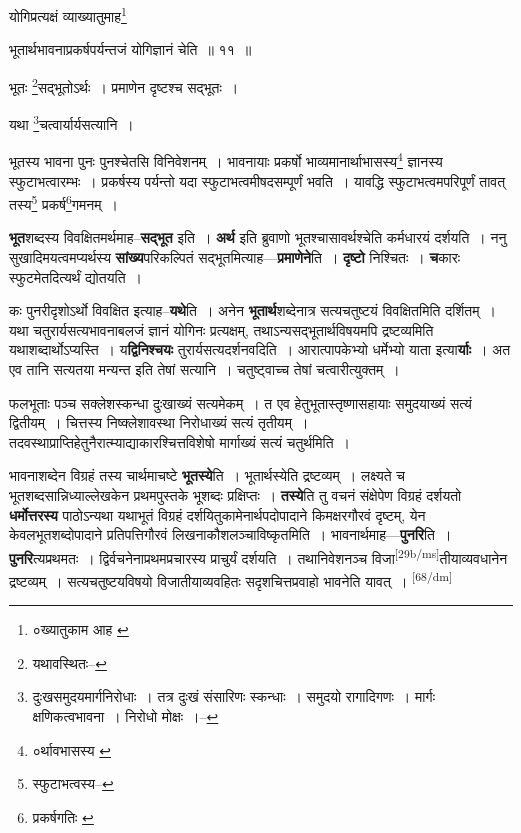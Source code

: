 \documentclass[article,12pt,a4paper]{memoir}
\begin{document}
	  \pstart योगिप्रत्यक्षं व्याख्यातुमाह\footnote{०ख्यातुकाम आह \cite{dp-msC} \cite{dp-msD}}
	\pend
      

	  \pstart भूतार्थभावनाप्रकर्षपर्यन्तजं योगिज्ञानं चेति ॥ ११ ॥
	\pend
      

	  \pstart भूतः \footnote{यथावस्थितः--\cite{dp-msD-n}}सद्भूतोऽर्थः । प्रमाणेन दृष्टश्च सद्भूतः ।
	\pend
      

	  \pstart यथा \footnote{दुःखसमुदयमार्गनिरोधाः । तत्र दुःखं संसारिणः स्कन्धाः । समुदयो रागादिगणः । मार्गः क्षणिकत्वभावना । निरोधो मोक्षः ।--\cite{dp-msD-n}}चत्वार्यार्यसत्यानि ।
	\pend
      

	  \pstart भूतस्य भावना पुनः पुनश्चेतसि विनिवेशनम् । भावनायाः प्रकर्षो भाव्यमानार्थाभासस्य\footnote{०र्थावभासस्य \cite{dp-msB} \cite{dp-edN}} ज्ञानस्य स्फुटाभत्वारम्भः । प्रकर्षस्य पर्यन्तो यदा स्फुटाभत्वमीषदसम्पूर्णं भवति । यावद्धि स्फुटाभत्वमपरिपूर्णं तावत् तस्य\footnote{स्फुटाभत्वस्य--\cite{dp-msD-n}} प्रकर्ष\footnote{प्रकर्षगतिः \cite{dp-msA} \cite{dp-edP} \cite{dp-edH} \cite{dp-edE} \cite{dp-edN}}गमनम् ।
	\pend
      

	  \pstart \textbf{भूत}शब्दस्य विवक्षितमर्थमाह--\textbf{सद्भूत} इति । \textbf{अर्थ} इति ब्रुवाणो भूतश्चासावर्थश्चेति कर्मधारयं दर्शयति । ननु सुखादिमयत्वमप्यर्थस्य \textbf{सांख्य}परिकल्पितं सद्भूतमित्याह—\textbf{प्रमाणेने}ति । \textbf{दृष्टो} निश्चितः । \textbf{च}कारः स्फुटमेतदित्यर्थं द्योतयति ।
	\pend
      

	  \pstart कः पुनरीदृशोऽर्थो विवक्षित इत्याह--\textbf{यथे}ति । अनेन \textbf{भूतार्थ}शब्देनात्र सत्यचतुष्टयं विवक्षितमिति दर्शितम् । यथा चतुरार्यसत्यभावनाबलजं ज्ञानं योगिनः प्रत्यक्षम्, तथाऽन्यसद्भूतार्थविषयमपि द्रष्टव्यमिति यथाशब्दार्थोऽप्यस्ति । य\textbf{द्विनिश्चयः} तुरार्यसत्यदर्शनवदिति । आरात्पापकेभ्यो धर्मेभ्यो याता इत्या\textbf{र्याः} । अत एव तानि सत्यतया मन्यन्त इति तेषां सत्यानि । चतुष्ट्वाच्च तेषां चत्वारीत्युक्तम् ।
	\pend
      

	  \pstart फलभूताः पञ्च सक्लेशस्कन्धा दुःखाख्यं सत्यमेकम् । त एव हेतुभूतास्तृष्णासहायाः समुदयाख्यं सत्यं द्वितीयम् । चित्तस्य निष्क्लेशावस्था निरोधाख्यं सत्यं तृतीयम् । तदवस्थाप्राप्तिहेतुनैरात्म्याद्याकारश्चित्तविशेषो मार्गाख्यं सत्यं चतुर्थमिति ।
	\pend
      

	  \pstart भावनाशब्देन विग्रहं तस्य चार्थमाचष्टे \textbf{भूतस्ये}ति । भूतार्थस्येति द्रष्टव्यम् । लक्ष्यते च भूतशब्दसान्निध्याल्लेखकेन प्रथमपुस्तके भूशब्दः प्रक्षिप्तः । \textbf{तस्ये}ति तु वचनं संक्षेपेण विग्रहं दर्शयतो \textbf{धर्मोत्तरस्य} पाठोऽन्यथा यथाभूतं विग्रहं दर्शयितुकामेनार्थपदोपादाने किमक्षरगौरवं दृष्टम्, येन केवलभूतशब्दोपादाने प्रतिपत्तिगौरवं लिखनाकौशलञ्चाविष्कृतमिति । भावनार्थमाह—\textbf{पुनरि}ति । \textbf{पुनरि}त्यप्रथमतः । द्विर्वचनेनाप्रथमप्रचारस्य प्राचुर्यं दर्शयति । तथानिवेशनञ्च विजा\leavevmode\textsuperscript{\rmlatinfont\tiny [29b/ms]}तीयाव्यवधानेन द्रष्टव्यम् । सत्यचतुष्टयविषयो विजातीयाव्यवहितः सदृशचित्तप्रवाहो भावनेति यावत् ।
	\pend
      \leavevmode\textsuperscript{\rmlatinfont\tiny [68/dm]}
\end{document}
